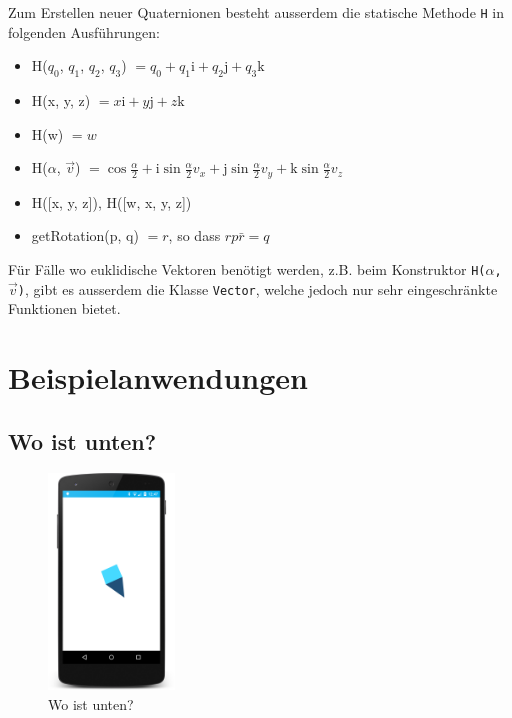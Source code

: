\documentclass[12pt]{article}
\begin{document}
  Zum Erstellen neuer Quaternionen besteht ausserdem die statische Methode \texttt{H} in folgenden Ausführungen:
  \begin{itemize}
    \item H($q_0$, $q_1$, $q_2$, $q_3$) $= q_0 + q_1 \mathrm{i} + q_2 \mathrm{j} + q_3 \mathrm{k}$
    \item H(x, y, z) $= x \mathrm{i} + y \mathrm{j} + z \mathrm{k}$
    \item H(w) $= w$
    \item H($\alpha$, $\vec{v}$) $= \cos\frac{\alpha}{2} + \mathrm{i} \sin\frac{\alpha}{2} v_x + \mathrm{j} \sin\frac{\alpha}{2} v_y + \mathrm{k} \sin\frac{\alpha}{2} v_z$
    \item H([x, y, z]), H([w, x, y, z])
    \item getRotation(p, q) $= r$, so dass $r p \bar{r} = q$
  \end{itemize}

  Für Fälle wo euklidische Vektoren benötigt werden, z.B. beim Konstruktor \texttt{H($\alpha$, $\vec{v}$)}, gibt es ausserdem die Klasse \texttt{Vector}, welche jedoch nur sehr eingeschränkte Funktionen bietet.

  \section{Beispielanwendungen}
  \subsection{Wo ist unten?}

\begin{figure} %
    \centering
    \includegraphics[width=0.3\textwidth]{down.png}
    \caption{Wo ist unten?}
    \label{fig:screenshot_down}
\end{figure}
\end{document}
